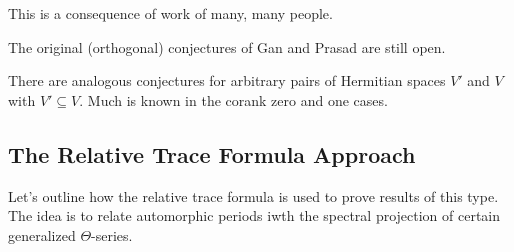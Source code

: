 \documentclass{article}
\begin{document}
This is a consequence of work of many, many people.
\begin{remark}
	The original (orthogonal) conjectures of Gan and Prasad are still open.
\end{remark}
\begin{remark}
	There are analogous conjectures for arbitrary pairs of Hermitian spaces $V'$ and $V$ with $V'\subseteq V$. Much is known in the corank zero and one cases.
\end{remark}

\subsection{The Relative Trace Formula Approach}
Let's outline how the relative trace formula is used to prove results of this type. The idea is to relate automorphic periods iwth the spectral projection of certain generalized $\Theta$-series.
\end{document}
